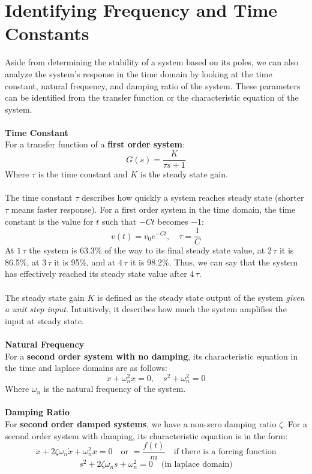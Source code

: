\documentclass[12pt]{article}
\begin{document}
\section*{Identifying Frequency and Time Constants}
Aside from determining the stability of a system based on its poles, we can also analyze the system's response in the time domain by looking at the time constant, natural frequency, and damping ratio of the system. These parameters can be identified from the transfer function or the characteristic equation of the system.\\\\
\textbf{Time Constant}\\
For a transfer function of a \textbf{first order system}:
\[\boxed{G(s) = \frac{K}{\tau s + 1}}\]
Where $\tau$ is the time constant and $K$ is the steady state gain.\\\\
The time constant $\tau$ describes how quickly a system reaches steady state (shorter $\tau$ means faster response). For a first order system in the time domain, the time constant is the value for $t$ such that $-Ct$ becomes $-1$:
\[v(t) = v_0 e^{-Ct}, \quad \tau = \frac{1}{C}\]
At $1\,\tau$ the system is 63.3\% of the way to its final steady state value, at $2\,\tau$ it is 86.5\%, at $3\,\tau$ it is 95\%, and at $4\,\tau$ it is 98.2\%. Thus, we can say that the system has effectively reached its steady state value after $4\,\tau$.\\\\
The steady state gain $K$ is defined as the steady state output of the system \textit{given a unit step input}. Intuitively, it describes how much the system amplifies the input at steady state.\\\\
\textbf{Natural Frequency}\\
For a \textbf{second order system with no damping}, its characteristic equation in the time and laplace domains are as follows:
\[\ddot{x} + \omega_n^2 x = 0, \quad s^2+ \omega_n^2 = 0\]
Where $\omega_n$ is the natural frequency of the system.\\\\
\textbf{Damping Ratio}\\
For \textbf{second order damped systems}, we have a non-zero damping ratio $\zeta$. For a second order system with damping, its characteristic equation is in the form:
\[\ddot{x} + 2\zeta \omega_n \dot{x} + \omega_n^2 x = 0\quad \text{or } =\frac{f(t)}{m} \quad \text{if there is a forcing function}\]
\[s^2 + 2\zeta \omega_n s + \omega_n^2 = 0 \quad \text{(in laplace domain)}\]
\end{document}
